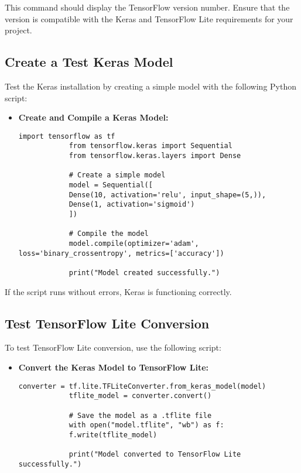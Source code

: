 	This command should display the TensorFlow version number. Ensure that the version is compatible with the Keras and TensorFlow Lite requirements for your project.
	
	\subsection{Create a Test Keras Model}
	
	Test the Keras installation by creating a simple model with the following Python script:
	
	\begin{itemize}
		\item \textbf{Create and Compile a Keras Model:}
		\begin{lstlisting}[caption={Creating a Keras Model}, label={code:create-keras-model}, style=pythonstyle]
			import tensorflow as tf
			from tensorflow.keras import Sequential
			from tensorflow.keras.layers import Dense
			
			# Create a simple model
			model = Sequential([
			Dense(10, activation='relu', input_shape=(5,)),
			Dense(1, activation='sigmoid')
			])
			
			# Compile the model
			model.compile(optimizer='adam', loss='binary_crossentropy', metrics=['accuracy'])
			
			print("Model created successfully.")
		\end{lstlisting}
	\end{itemize}
	
	If the script runs without errors, Keras is functioning correctly.
	
	\subsection{Test TensorFlow Lite Conversion}
	
	To test TensorFlow Lite conversion, use the following script:
	
	\begin{itemize}
		\item \textbf{Convert the Keras Model to TensorFlow Lite:}
		\begin{lstlisting}[caption={TensorFlow Lite Conversion}, label={code:tflite-conversion}, style=pythonstyle]
			converter = tf.lite.TFLiteConverter.from_keras_model(model)
			tflite_model = converter.convert()
			
			# Save the model as a .tflite file
			with open("model.tflite", "wb") as f:
			f.write(tflite_model)
			
			print("Model converted to TensorFlow Lite successfully.")
		\end{lstlisting}
	\end{itemize}
	
